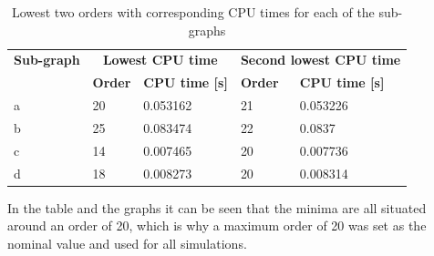 \begin{table}[H]
\begin{center}
\caption{Lowest two orders with corresponding CPU times for each of the sub-graphs}
\label{tab:orderAndCPUtimes}
\begin{tabular}{|l|l|l|l|l|}
\hline 
\textbf{Sub-graph}  & \multicolumn{2}{c|}{\textbf{Lowest CPU time}} & \multicolumn{2}{c|}{\textbf{Second lowest CPU time}} \\ \cline{2-5}

& \textbf{Order} &
\textbf{CPU time [s]} & \textbf{Order} & \textbf{CPU time [s]} \\ \hline \hline

a & 20 & 0.053162 & 21 & 0.053226 \\ \hline
b & 25 & 0.083474 & 22 & 0.0837 \\ \hline
c & 14 & 0.007465 & 20 & 0.007736 \\ \hline
d & 18 & 0.008273 & 20 & 0.008314 \\ \hline


\end{tabular}
\end{center}
\end{table}

\noindent
In the table and the graphs it can be seen that the minima are all situated around an order of 20, which is why a maximum order of 20 was set as the nominal value and used for all simulations.


%
%



